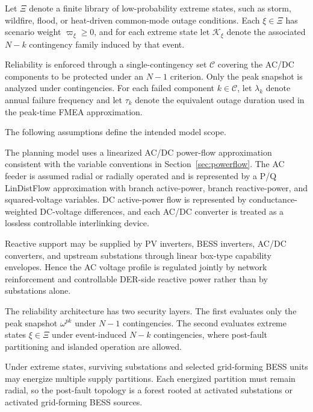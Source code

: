 Let \(\Xi\) denote a finite library of low-probability extreme states, such as storm, wildfire, flood, or heat-driven common-mode outage conditions. Each \(\xi\in\Xi\) has scenario weight \(\varpi_\xi\ge 0\), and for each extreme state let \(\mathcal{K}_\xi\) denote the associated \(N{-}k\) contingency family induced by that event.

Reliability is enforced through a single-contingency set \(\mathcal{C}\) covering the AC/DC components to be protected under an \(N{-}1\) criterion. Only the peak snapshot is analyzed under contingencies. For each failed component \(k\in\mathcal{C}\), let \(\lambda_k\) denote annual failure frequency and let \(\tau_k\) denote the equivalent outage duration used in the peak-time FMEA approximation.

The following assumptions define the intended model scope.

\begin{assumption}
The planning model uses a linearized AC/DC power-flow approximation consistent with the variable conventions in Section~\ref{sec:powerflow}. The AC feeder is assumed radial or radially operated and is represented by a P/Q LinDistFlow approximation with branch active-power, branch reactive-power, and squared-voltage variables. DC active-power flow is represented by conductance-weighted DC-voltage differences, and each AC/DC converter is treated as a lossless controllable interlinking device.
\end{assumption}

\begin{assumption}
Reactive support may be supplied by PV inverters, BESS inverters, AC/DC converters, and upstream substations through linear box-type capability envelopes. Hence the AC voltage profile is regulated jointly by network reinforcement and controllable DER-side reactive power rather than by substations alone.
\end{assumption}

\begin{assumption}
The reliability architecture has two security layers. The first evaluates only the peak snapshot \(\omega^{pk}\) under \(N{-}1\) contingencies. The second evaluates extreme states \(\xi\in\Xi\) under event-induced \(N{-}k\) contingencies, where post-fault partitioning and islanded operation are allowed.
\end{assumption}

\begin{assumption}
Under extreme states, surviving substations and selected grid-forming BESS units may energize multiple supply partitions. Each energized partition must remain radial, so the post-fault topology is a forest rooted at activated substations or activated grid-forming BESS sources.
\end{assumption}


